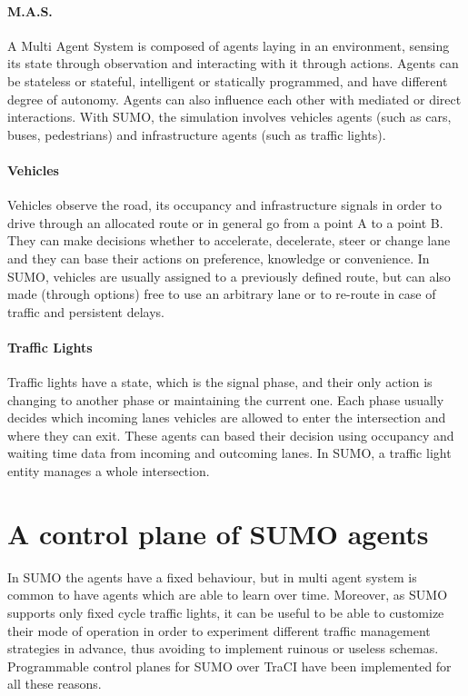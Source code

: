 \paragraph{M.A.S.}

A Multi Agent System is composed of agents laying in an environment, sensing its state through observation and interacting with it through actions. Agents can be stateless or stateful, intelligent or statically programmed, and have different degree of autonomy. Agents can also influence each other with mediated or direct interactions. With SUMO, the simulation involves vehicles agents (such as cars, buses, pedestrians) and infrastructure agents (such as traffic lights).

\paragraph{Vehicles}

Vehicles observe the road, its occupancy and infrastructure signals in order to drive through an allocated route or in general go from a point A to a point B. They can make decisions whether to accelerate, decelerate, steer or change lane and they can base their actions on preference, knowledge or convenience. In SUMO, vehicles are usually assigned to a previously defined route, but can also made (through options) free to use an arbitrary lane or to re-route in case of traffic and persistent delays.

\paragraph{Traffic Lights}

Traffic lights have a state, which is the signal phase, and their only action is changing to another phase or maintaining the current one. Each phase usually decides which incoming lanes vehicles are allowed to enter the intersection and where they can exit. These agents can based their decision using occupancy and waiting time data from incoming and outcoming lanes. In SUMO, a traffic light entity manages a whole intersection.

\section{A control plane of SUMO agents}

In SUMO the agents have a fixed behaviour, but in multi agent system is common to have agents which are able to learn over time. Moreover, as SUMO supports only fixed cycle traffic lights, it can be useful to be able to customize their mode of operation in order to experiment different traffic management strategies in advance, thus avoiding to implement ruinous or useless schemas. Programmable control planes for SUMO over TraCI have been implemented for all these reasons.

